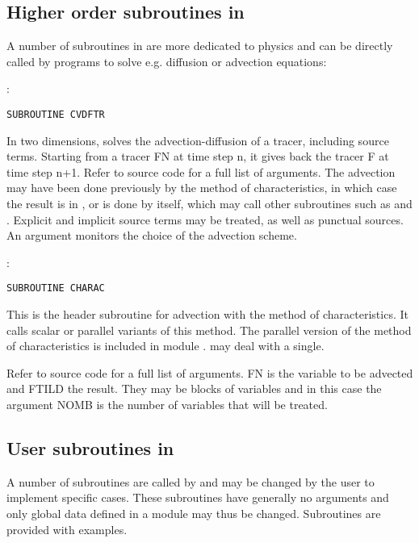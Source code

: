 \subsection{Higher order subroutines in \bief}

A number of subroutines in \bief are more dedicated to physics and can be
directly called by programs to solve e.g. diffusion or advection equations:

:
\begin{lstlisting}[language=TelFortran]
SUBROUTINE CVDFTR
\end{lstlisting}

In two dimensions, solves the advection-diffusion of a tracer, including source
terms. Starting from a tracer FN at time step n, it gives back the tracer F at
time step n+1. Refer to source code for a full list of arguments. The advection
may have been done previously by the method of characteristics, in which case
the result is in , or is done by  itself, which
may call other subroutines such as  and .
Explicit and implicit source terms may be treated, as well as punctual sources.
An argument  monitors the choice of the advection scheme.

:
\begin{lstlisting}[language=TelFortran]
SUBROUTINE CHARAC
\end{lstlisting}

This is the header subroutine for advection with the method of characteristics.
It calls scalar or parallel variants of this method. The parallel version of
the method of characteristics is included in module .
 may deal with a single.

Refer to source code for a full list of arguments. FN is the variable to be
advected and FTILD the result. They may be blocks of variables and in this case
the argument NOMB is the number of variables that will be treated.

\subsection{User subroutines in \bief}

A number of subroutines are called by \bief and may be changed by the user to
implement specific cases. These subroutines have generally no arguments and
only global data defined in a module may thus be changed. Subroutines are
provided with examples.

